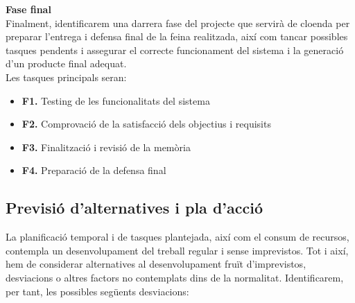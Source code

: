 \noindent \textbf{\large Fase final}\\

\noindent Finalment, identificarem una darrera fase del projecte que servirà de cloenda per preparar l’entrega i defensa final de la feina realitzada, així com tancar possibles tasques pendents i assegurar el correcte funcionament del sistema i la generació d’un producte final adequat. \\

Les tasques principals seran:

\begin{itemize}
\item \textbf{F1.} Testing de les funcionalitats del sistema
\item \textbf{F2.} Comprovació de la satisfacció dels objectius i requisits
\item \textbf{F3.} Finalització i revisió de la memòria
\item \textbf{F4.} Preparació de la defensa final
\end{itemize}

\subsection{Previsió d'alternatives i pla d'acció}

La planificació temporal i de tasques plantejada, així com el consum de recursos, contempla un desenvolupament del treball regular i sense imprevistos. Tot i així, hem de considerar alternatives al desenvolupament fruït d’imprevistos, desviacions o altres factors no contemplats dins de la normalitat. Identificarem, per tant, les possibles següents desviacions:


